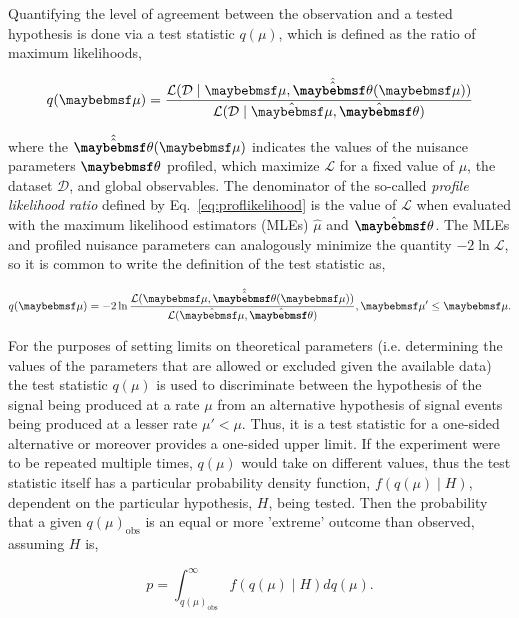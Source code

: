 Quantifying the level of agreement between the observation and a tested hypothesis is done via a test statistic $q(\mu)$, which is defined as the ratio of maximum likelihoods,

\begin{equation}
  q(\mu) = \frac{\mathcal{L}(\mathcal{D}\mid\mu,\hat{\hat{\textbf{\theta}}}(\mu))}{\mathcal{L}(\mathcal{D}\mid\hat{\mu},\hat{\textbf{\theta}})}
  \label{eq:proflikelihood}
\end{equation}

where the $\hat{\hat{\textbf{\theta}}}(\mu)$ indicates the values of the nuisance parameters $\textbf{\theta}$ profiled, which maximize $\mathcal{L}$ for a fixed value of $\mu$, the dataset $\mathcal{D}$, and global observables. The denominator of the so-called \textit{profile likelihood ratio} defined by Eq.~\ref{eq:proflikelihood} is the value of $\mathcal{L}$ when evaluated with the maximum likelihood estimators (MLEs) $\hat{\mu}$ and $\hat{\textbf{\theta}}$. The MLEs and profiled nuisance parameters can analogously minimize the quantity $-2\ln{\mathcal{L}}$, so it is common to write the definition of the test statistic as,

\begin{equation}
   q(\mu) = -2\ln{\frac{\mathcal{L}(\mu,\hat{\hat{\textbf{\theta}}}(\mu))}{\mathcal{L}(\hat{\mu},\hat{\textbf{\theta}})}}, \mu' \leq \mu.
   \label{eq:likelihood}
\end{equation}

For the purposes of setting limits on theoretical parameters (i.e. determining the values of the parameters that are allowed or excluded given the available data) the test statistic $q(\mu)$ is used to discriminate between the hypothesis of the signal being produced at a rate $\mu$ from an alternative hypothesis of signal events being produced at a lesser rate $\mu' < \mu$. Thus, it is a test statistic for a one-sided alternative or moreover provides a one-sided upper limit. If the experiment were to be repeated multiple times, $q(\mu)$ would take on different values, thus the test statistic itself has a particular probability density function, $f(q(\mu)\mid H)$, dependent on the particular hypothesis, $H$, being tested. Then the probability that a given $q(\mu)_{\textrm{obs}}$ is an equal or more 'extreme' outcome than observed, assuming $H$ is,

\begin{equation}
  p = \int_{q(\mu)_{\textrm{obs}}}^{\infty} f(q(\mu)\mid H)\xspace dq(\mu).
\label{eq:pvalue}
\end{equation}

